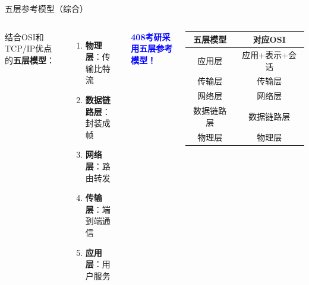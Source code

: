 \documentclass[10pt, aspectratio=169]{beamer}
\begin{document}
\begin{frame}{五层参考模型（综合）}
    \begin{columns}[T]
        结合OSI和TCP/IP优点的\textbf{五层模型}：
        \begin{enumerate}
            \item \textbf{物理层}：传输比特流
            \item \textbf{数据链路层}：封装成帧
            \item \textbf{网络层}：路由转发
            \item \textbf{传输层}：端到端通信
            \item \textbf{应用层}：用户服务
        \end{enumerate}
        \vspace{0.5em}
        \textcolor{blue}{\textbf{408考研采用五层参考模型！}}
        \begin{table}
            \small
            \begin{tabular}{|c|c|}
                \hline
                \textbf{五层模型} & \textbf{对应OSI} \\ \hline
                应用层 & 应用+表示+会话 \\
                传输层 & 传输层 \\
                网络层 & 网络层 \\
                数据链路层 & 数据链路层 \\
                物理层 & 物理层 \\
                \hline
            \end{tabular}
        \end{table}
    \end{columns}
\end{frame}
\end{document}
